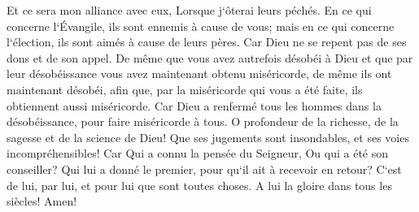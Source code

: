 \verse Et ce sera mon alliance avec eux, Lorsque j`ôterai leurs péchés. 
\verse En ce qui concerne l`Évangile, ils sont ennemis à cause de vous; mais en ce qui concerne l`élection, ils sont aimés à cause de leurs pères. 
\verse Car Dieu ne se repent pas de ses dons et de son appel. 
\verse De même que vous avez autrefois désobéi à Dieu et que par leur désobéissance vous avez maintenant obtenu miséricorde, 
\verse de même ils ont maintenant désobéi, afin que, par la miséricorde qui vous a été faite, ils obtiennent aussi miséricorde. 
\verse Car Dieu a renfermé tous les hommes dans la désobéissance, pour faire miséricorde à tous. 
\verse O profondeur de la richesse, de la sagesse et de la science de Dieu! Que ses jugements sont insondables, et ses voies incompréhensibles! Car 
\verse Qui a connu la pensée du Seigneur, Ou qui a été son conseiller? 
\verse Qui lui a donné le premier, pour qu`il ait à recevoir en retour? 
\verse C`est de lui, par lui, et pour lui que sont toutes choses. A lui la gloire dans tous les siècles! Amen! 

